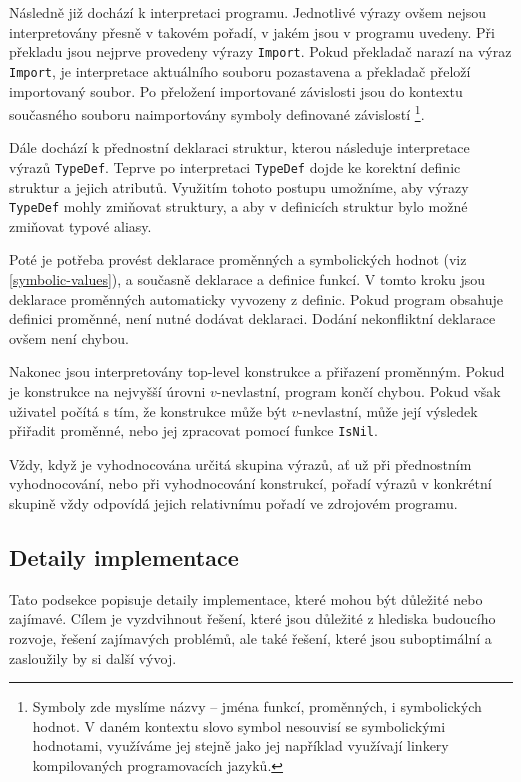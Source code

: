 Následně již dochází k interpretaci programu. Jednotlivé výrazy ovšem nejsou interpretovány přesně
v takovém pořadí, v jakém jsou v programu uvedeny. Při překladu jsou nejprve provedeny výrazy
\lstinline{Import}. Pokud překladač narazí na výraz \lstinline{Import}, je interpretace aktuálního
souboru pozastavena a překladač přeloží importovaný soubor. Po přeložení importované závislosti
jsou do kontextu současného souboru naimportovány symboly definované závislostí \footnote{
  Symboly zde myslíme názvy -- jména funkcí, proměnných, i symbolických hodnot. V daném kontextu
  slovo symbol nesouvisí se symbolickými hodnotami, využíváme jej stejně jako jej například
  využívají linkery kompilovaných programovacích jazyků.
}.

Dále dochází k přednostní deklaraci struktur, kterou následuje interpretace výrazů
\lstinline{TypeDef}. Teprve po interpretaci \lstinline{TypeDef} dojde ke korektní definic struktur
a jejich atributů. Využitím tohoto postupu umožníme, aby výrazy \lstinline{TypeDef} mohly zmiňovat
struktury, a aby v definicích struktur bylo možné zmiňovat typové aliasy.

Poté je potřeba provést deklarace proměnných a symbolických hodnot (viz \ref{symbolic-values}),
a současně deklarace a definice funkcí. V tomto kroku jsou deklarace proměnných automaticky
vyvozeny z definic. Pokud program obsahuje definici proměnné, není nutné dodávat deklaraci. Dodání
nekonfliktní deklarace ovšem není chybou.

Nakonec jsou interpretovány top-level konstrukce a přiřazení proměnným. Pokud je konstrukce
na nejvyšší úrovni $v$-nevlastní, program končí chybou. Pokud však uživatel počítá s tím, že
konstrukce může být $v$-nevlastní, může její výsledek přiřadit proměnné, nebo jej zpracovat
pomocí funkce \lstinline{IsNil}.

Vždy, když je vyhodnocována určitá skupina výrazů, ať už při přednostním vyhodnocování, nebo při
vyhodnocování konstrukcí, pořadí výrazů v konkrétní skupině vždy odpovídá jejich relativnímu pořadí
ve zdrojovém programu.

\subsection{Detaily implementace}

Tato podsekce popisuje detaily implementace, které mohou být důležité nebo zajímavé. Cílem je
vyzdvihnout řešení, které jsou důležité z hlediska budoucího rozvoje, řešení zajímavých problémů,
ale také řešení, které jsou suboptimální a zasloužily by si další vývoj.

